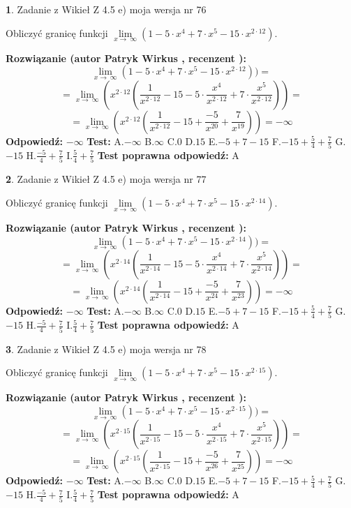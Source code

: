 \documentclass[12pt, a4paper]{article}
\theoremstyle{definition} %
\newtheorem{zad}{}
\newcommand{\zadStart}[1]{\begin{zad}#1\newline}
\newcommand{\zadStop}{\end{zad}}
\newcommand{\rozwStart}[2]{\noindent \textbf{Rozwiązanie (autor #1 , recenzent #2): }\newline}
\newcommand{\rozwStop}{\newline}
\newcommand{\odpStart}{\noindent \textbf{Odpowiedź:}\newline}
\newcommand{\odpStop}{\newline}
\newcommand{\testStart}{\noindent \textbf{Test:}\newline}
\newcommand{\testStop}{\newline}
\newcommand{\kluczStart}{\noindent \textbf{Test poprawna odpowiedź:}\newline}
\newcommand{\kluczStop}{\newline}
\begin{document}
\zadStart{Zadanie z Wikieł Z 4.5 e) moja wersja nr 76}



Obliczyć granicę funkcji  $\lim\limits_{x\to\ \infty}(1 - 5 \cdot x^{4}+7 \cdot x^{5}- 15 \cdot x^{2\cdot12})$.
\zadStop
\rozwStart{Patryk Wirkus}{}
$$\lim\limits_{x\to\ \infty}(1 - 5 \cdot x^{4}+7 \cdot x^{5}- 15 \cdot x^{2\cdot12}))=$$
$$=\lim\limits_{x\to\ \infty}(x^{2\cdot12}(\frac{1}{x^{2\cdot12}}-15 -5 \cdot \frac{x^{4}}{x^{2\cdot12}}+7 \cdot \frac{x^{5}}{x^{2\cdot12}}))=$$
$$=\lim\limits_{x\to\ \infty}(x^{2\cdot12}(\frac{1}{x^{2\cdot12}}-15 + \frac{-5}{x^{20}}+ \frac{7}{x^{19}}))=-\infty$$
\rozwStop
\odpStart
$-\infty$
\odpStop
\testStart
A.$-\infty$ B.$\infty$ C.$0$ D.$15$ E.$-5 + 7 - 15$
F.$-15+\frac{5}{4}+\frac{7}{5}$ G.$-15$
H.$\frac{-5}{4}+\frac{7}{5}$
I.$\frac{5}{4}+\frac{7}{5}$
\testStop
\kluczStart
A
\kluczStop



\zadStart{Zadanie z Wikieł Z 4.5 e) moja wersja nr 77}



Obliczyć granicę funkcji  $\lim\limits_{x\to\ \infty}(1 - 5 \cdot x^{4}+7 \cdot x^{5}- 15 \cdot x^{2\cdot14})$.
\zadStop
\rozwStart{Patryk Wirkus}{}
$$\lim\limits_{x\to\ \infty}(1 - 5 \cdot x^{4}+7 \cdot x^{5}- 15 \cdot x^{2\cdot14}))=$$
$$=\lim\limits_{x\to\ \infty}(x^{2\cdot14}(\frac{1}{x^{2\cdot14}}-15 -5 \cdot \frac{x^{4}}{x^{2\cdot14}}+7 \cdot \frac{x^{5}}{x^{2\cdot14}}))=$$
$$=\lim\limits_{x\to\ \infty}(x^{2\cdot14}(\frac{1}{x^{2\cdot14}}-15 + \frac{-5}{x^{24}}+ \frac{7}{x^{23}}))=-\infty$$
\rozwStop
\odpStart
$-\infty$
\odpStop
\testStart
A.$-\infty$ B.$\infty$ C.$0$ D.$15$ E.$-5 + 7 - 15$
F.$-15+\frac{5}{4}+\frac{7}{5}$ G.$-15$
H.$\frac{-5}{4}+\frac{7}{5}$
I.$\frac{5}{4}+\frac{7}{5}$
\testStop
\kluczStart
A
\kluczStop



\zadStart{Zadanie z Wikieł Z 4.5 e) moja wersja nr 78}



Obliczyć granicę funkcji  $\lim\limits_{x\to\ \infty}(1 - 5 \cdot x^{4}+7 \cdot x^{5}- 15 \cdot x^{2\cdot15})$.
\zadStop
\rozwStart{Patryk Wirkus}{}
$$\lim\limits_{x\to\ \infty}(1 - 5 \cdot x^{4}+7 \cdot x^{5}- 15 \cdot x^{2\cdot15}))=$$
$$=\lim\limits_{x\to\ \infty}(x^{2\cdot15}(\frac{1}{x^{2\cdot15}}-15 -5 \cdot \frac{x^{4}}{x^{2\cdot15}}+7 \cdot \frac{x^{5}}{x^{2\cdot15}}))=$$
$$=\lim\limits_{x\to\ \infty}(x^{2\cdot15}(\frac{1}{x^{2\cdot15}}-15 + \frac{-5}{x^{26}}+ \frac{7}{x^{25}}))=-\infty$$
\rozwStop
\odpStart
$-\infty$
\odpStop
\testStart
A.$-\infty$ B.$\infty$ C.$0$ D.$15$ E.$-5 + 7 - 15$
F.$-15+\frac{5}{4}+\frac{7}{5}$ G.$-15$
H.$\frac{-5}{4}+\frac{7}{5}$
I.$\frac{5}{4}+\frac{7}{5}$
\testStop
\kluczStart
A
\kluczStop
\end{document}
